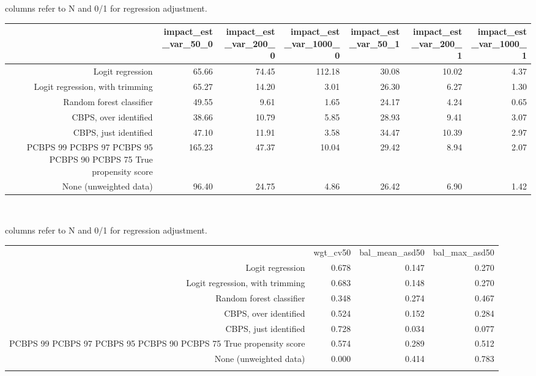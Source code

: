 columns refer to N and 0/1 for regression adjustment.
\begin{center}
\begin{tabular}{rrrrrrr}
\hline  & impact_est_var_50_0 & impact_est_var_200_0 & impact_est_var_1000_0 & impact_est_var_50_1 & impact_est_var_200_1 & impact_est_var_1000_1\\
\hline Logit regression & 65.66 & 74.45 & 112.18 & 30.08 & 10.02 & 4.37\\
Logit regression, with trimming & 65.27 & 14.20 & 3.01 & 26.30 & 6.27 & 1.30\\
Random forest classifier & 49.55 & 9.61 & 1.65 & 24.17 & 4.24 & 0.65\\
CBPS, over identified & 38.66 & 10.79 & 5.85 & 28.93 & 9.41 & 3.07\\
CBPS, just identified & 47.10 & 11.91 & 3.58 & 34.47 & 10.39 & 2.97\\
PCBPS 99%
PCBPS 97%
PCBPS 95%
PCBPS 90%
PCBPS 75%
True propensity score & 165.23 & 47.37 & 10.04 & 29.42 & 8.94 & 2.07\\
None (unweighted data) & 96.40 & 24.75 & 4.86 & 26.42 & 6.90 & 1.42\\
\hline\end{tabular}\\
\end{center}

columns refer to N and 0/1 for regression adjustment.
\begin{center}
\begin{tabular}{rrrr}
\hline \noalign{\smallskip} & wgt_cv50 & bal_mean_asd50 & bal_max_asd50\\
\noalign{\smallskip}\hline \noalign{\smallskip}Logit regression & 0.678 & 0.147 & 0.270\\
Logit regression, with trimming & 0.683 & 0.148 & 0.270\\
Random forest classifier & 0.348 & 0.274 & 0.467\\
CBPS, over identified & 0.524 & 0.152 & 0.284\\
CBPS, just identified & 0.728 & 0.034 & 0.077\\
PCBPS 99%
PCBPS 97%
PCBPS 95%
PCBPS 90%
PCBPS 75%
True propensity score & 0.574 & 0.289 & 0.512\\
None (unweighted data) & 0.000 & 0.414 & 0.783\\
\noalign{\smallskip}\hline\end{tabular}\\
\end{center}
